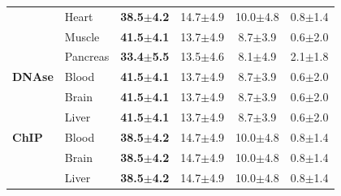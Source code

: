 \begin{table}[t]
{\begin{tabular}{llcccc}
 & Heart & \textbf{38.5$\pm$4.2} & 14.7$\pm$4.9 & 10.0$\pm$4.8 & 0.8$\pm$1.4 \\
 & Muscle & \textbf{41.5$\pm$4.1} & 13.7$\pm$4.9 & 8.7$\pm$3.9 & 0.6$\pm$2.0 \\
 & Pancreas & \textbf{33.4$\pm$5.5} & 13.5$\pm$4.6 & 8.1$\pm$4.9 & 2.1$\pm$1.8 \\
\midrule
\textbf{DNAse} & Blood & \textbf{41.5$\pm$4.1} & 13.7$\pm$4.9 & 8.7$\pm$3.9 & 0.6$\pm$2.0 \\
 & Brain & \textbf{41.5$\pm$4.1} & 13.7$\pm$4.9 & 8.7$\pm$3.9 & 0.6$\pm$2.0 \\
 & Liver & \textbf{41.5$\pm$4.1} & 13.7$\pm$4.9 & 8.7$\pm$3.9 & 0.6$\pm$2.0 \\
\midrule
\textbf{ChIP} & Blood & \textbf{38.5$\pm$4.2} & 14.7$\pm$4.9 & 10.0$\pm$4.8 & 0.8$\pm$1.4 \\
 & Brain & \textbf{38.5$\pm$4.2} & 14.7$\pm$4.9 & 10.0$\pm$4.8 & 0.8$\pm$1.4 \\
 & Liver & \textbf{38.5$\pm$4.2} & 14.7$\pm$4.9 & 10.0$\pm$4.8 & 0.8$\pm$1.4 \\
\bottomrule
\end{tabular}}
\end{table}